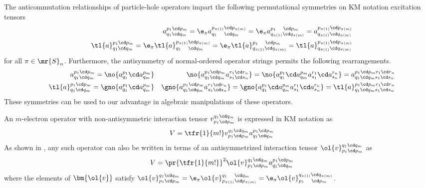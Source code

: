 \documentclass[11pt,fleqn]{article}
\numberwithin{equation}{section}
\begin{document}
\begin{rmk}\label{permutational-symmetries-of-km-notation-excitation-operators}
The anticommutation relationships of particle-hole operators impart the following permutational symmetries on KM notation excitation tensors
\begin{align}
&&
  a^{p_1\cd p_m}_{q_1\cd q_m}
=
  \e_{\pi}
  a^{p_{\pi(1)}\cd p_{\pi(m)}}_{q_1\hphantom{_{\pi()}}\cd q_m}
=
  \e_{\pi}
  a^{p_1\hphantom{_{\pi()}}\cd p_m}_{q_{\pi(1)}\cd q_{\pi(m)}}
=
  a^{p_{\pi(1)}\cd p_{\pi(m)}}_{q_{\pi(1)}\cd q_{\pi(m)}}
\\
&&
  \tl{a}^{p_1\cd p_m}_{q_1\cd q_m}
=
  \e_{\pi}
  \tl{a}^{p_{\pi(1)}\cd p_{\pi(m)}}_{q_1\hphantom{_{\pi()}}\cd q_m}
=
  \e_{\pi}
  \tl{a}^{p_1\hphantom{_{\pi()}}\cd p_m}_{q_{\pi(1)}\cd q_{\pi(m)}}
=
  \tl{a}^{p_{\pi(1)}\cd p_{\pi(m)}}_{q_{\pi(1)}\cd q_{\pi(m)}}
\end{align}
for all $\pi\in\mr{S}_n$.
Furthermore, the antisymmetry of normal-ordered operator strings permits the following rearrangements.
\begin{align}
&&
  a^{p_1\cd p_m}_{q_1\cd q_m}
=
  \no{a^{p_1}_{q_1}\cd a^{p_m}_{q_m}}
&&
  \no{a^{p_1\cd p_m}_{q_1\cd q_m}a^{r_1\cd r_n}_{s_1\cd s_n}}
=
  \no{a^{p_1}_{q_1}\cd a^{p_m}_{q_m}a^{r_1}_{s_1}\cd a^{r_n}_{s_n}}
=
  a^{p_1\cd p_mr_1\cd r_n}_{q_1\cd q_ms_1\cd s_n}
\\
&&
  \tl{a}^{p_1\cd p_m}_{q_1\cd q_m}
=
  \gno{a^{p_1}_{q_1}\cd a^{p_m}_{q_m}}
&&
  \gno{a^{p_1\cd p_m}_{q_1\cd q_m}a^{r_1\cd r_n}_{s_1\cd s_n}}
=
  \gno{a^{p_1}_{q_1}\cd a^{p_m}_{q_m}a^{r_1}_{s_1}\cd a^{r_n}_{s_n}}
=
  \tl{a}^{p_1\cd p_mr_1\cd r_n}_{q_1\cd q_ms_1\cd s_n}
\end{align}
These symmetries can be used to our advantage in algebraic manipulations of these operators.
\end{rmk}


\begin{dfn}\label{dfn:m-electorn-operators-antisymmetric-interaction-tensors}
An $m$-electron operator with non-antisymmetric interaction tensor $v_{p_1\cd p_m}^{q_1\cd q_m}$ is expressed in KM notation as
\begin{align*}
&&
  V
=
  \tfr{1}{m!}
  v_{p_1\cd p_m}^{q_1\cd q_m}
  a^{p_1\cd p_m}_{q_1\cd q_m}
\end{align*}
As shown in , any such operator can also be written in terms of an antisymmetrized interaction tensor $\ol{v}_{p_1\cd p_m}^{q_1\cd q_m}$ as
\begin{align*}
&&
  V
=
  \pr{\tfr{1}{m!}}^2
  \ol{v}_{p_1\cd p_m}^{q_1\cd q_m}
  a^{p_1\cd p_m}_{q_1\cd q_m}
\end{align*}
where the elements of $\bm{\ol{v}}$ satisfy
$
  \ol{v}_{p_1\cd p_m}^{q_1\cd q_m}
=
  \e_{\pi}
  \ol{v}_{p_{\pi(1)}\cd p_{\pi(m)}}^{q_1\hphantom{_{\pi()}}\cd q_m}
=
  \e_{\pi}
  \ol{v}_{p_1\hphantom{_{\pi()}}\cd p_m}^{q_{\pi(1)}\cd q_{\pi(m)}}
$.
\end{dfn}
\end{document}
